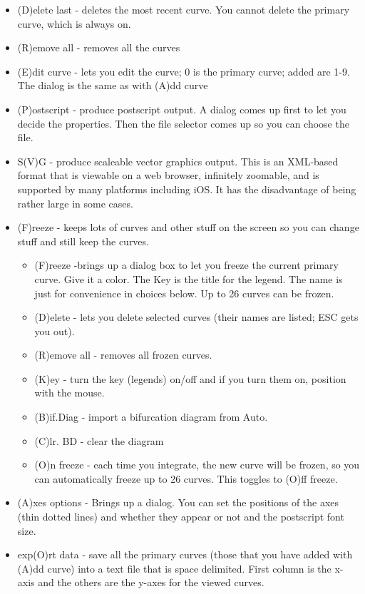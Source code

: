 \documentclass{article}
\begin{document}
\begin{itemize}
\begin{itemize}
\item (D)elete last - deletes the most recent curve. You cannot delete the primary curve, which is always on.
\item (R)emove all - removes all the curves
\item (E)dit curve - lets you edit the curve; 0 is the primary curve; added are 1-9.  The dialog is the same as with (A)dd curve
\item (P)ostscript - produce postscript output. A dialog comes up first to let you decide the properties. Then the file selector comes up so you can choose the file. 
\item S(V)G - produce scaleable vector graphics output. This is an XML-based format that is viewable on a web browser, infinitely zoomable, and is supported by many platforms including iOS. It has the disadvantage of being rather large in some cases.
\item (F)reeze - keeps lots of curves and other stuff on the screen so you can change stuff and still keep the curves.
\begin{itemize} 
\item (F)reeze -brings up a dialog box to let you freeze the current primary curve. Give it a color. The Key is the title for the legend. The name is just for convenience in choices below.  Up to 26 curves can be frozen.
\item (D)elete - lets you delete selected curves (their names are listed; ESC gets you out).
\item (R)emove all - removes all frozen curves. 
\item (K)ey - turn the key (legends) on/off and if you turn them on, position with the mouse.
\item (B)if.Diag - import a bifurcation diagram from Auto.
\item (C)lr. BD - clear the diagram
\item (O)n freeze - each time you integrate, the new curve will be frozen, so you can automatically freeze up to 26 curves. This toggles to (O)ff freeze.
\end{itemize}
\item (A)xes options - Brings up a dialog. You can set the positions of the axes (thin dotted lines) and whether they appear or not and the postscript font size.
\item exp(O)rt data - save all the primary curves (those that you have added with (A)dd curve) into a text file that is space delimited. First column is the x-axis and the others are the y-axes for the  viewed curves.

\end{itemize}
\end{itemize}
\end{document}
